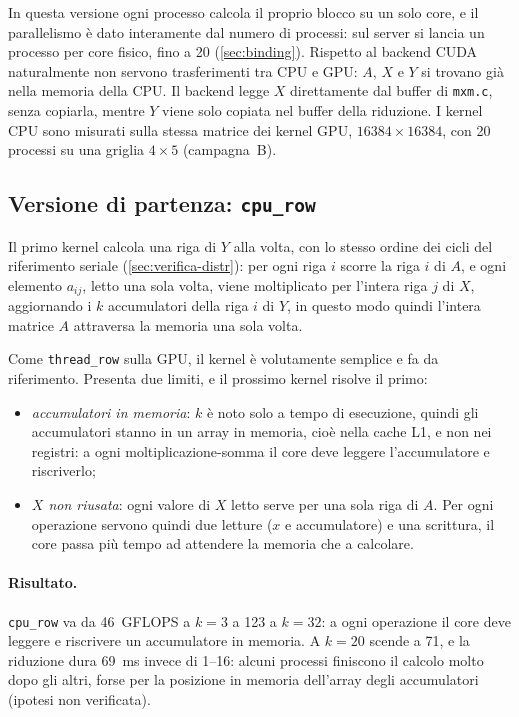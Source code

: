 \documentclass[11pt,a4paper]{article}
\begin{document}
In questa versione ogni processo calcola il proprio blocco su un solo core, e
il parallelismo è dato interamente dal numero di processi: sul server si lancia
un processo per core fisico, fino a 20 (\cref{sec:binding}). Rispetto al
backend CUDA naturalmente non servono trasferimenti tra CPU e GPU: $A$, $X$ e
$Y$ si trovano già nella memoria della CPU. Il backend legge $X$ direttamente
dal buffer di \texttt{mxm.c}, senza copiarla, mentre $Y$ viene solo copiata nel
buffer della riduzione. I kernel CPU sono misurati sulla
stessa matrice dei kernel GPU, $16384 \times 16384$, con 20 processi su una
griglia $4 \times 5$ (campagna~B).

\subsection{Versione di partenza: \texttt{cpu\_row}}\label{sec:cpu-row}

Il primo kernel calcola una riga di $Y$ alla volta, con lo stesso ordine dei
cicli del riferimento seriale (\cref{sec:verifica-distr}): per ogni riga $i$ scorre
la riga $i$ di $A$, e ogni elemento $a_{ij}$, letto una sola volta, viene
moltiplicato per l'intera riga $j$ di $X$, aggiornando i $k$ accumulatori della
riga $i$ di $Y$, in questo modo quindi l'intera matrice $A$ attraversa la memoria una sola volta.

Come \texttt{thread\_row} sulla GPU, il kernel è volutamente semplice e fa da
riferimento. Presenta due limiti, e il prossimo kernel risolve il primo:
\begin{itemize}
  \item \emph{accumulatori in memoria}: $k$ è noto solo a tempo di esecuzione,
        quindi gli accumulatori stanno in un array in memoria, cioè nella cache
        L1, e non nei registri: a ogni moltiplicazione-somma il core deve
        leggere l'accumulatore e riscriverlo;
  \item \emph{$X$ non riusata}: ogni valore di $X$ letto serve per una sola
        riga di $A$. Per ogni operazione servono quindi due letture ($x$ e
        accumulatore) e una scrittura, il core passa più tempo ad attendere
        la memoria che a calcolare.
\end{itemize}

\paragraph{Risultato.} \texttt{cpu\_row} va da 46~GFLOPS a $k = 3$ a 123 a
$k = 32$: a ogni operazione il core deve leggere e riscrivere un accumulatore in
memoria. A $k = 20$ scende a 71, e la riduzione dura 69~ms invece di 1--16:
alcuni processi finiscono il calcolo molto dopo gli altri, forse per la
posizione in memoria dell'array degli accumulatori (ipotesi non verificata).
\end{document}
